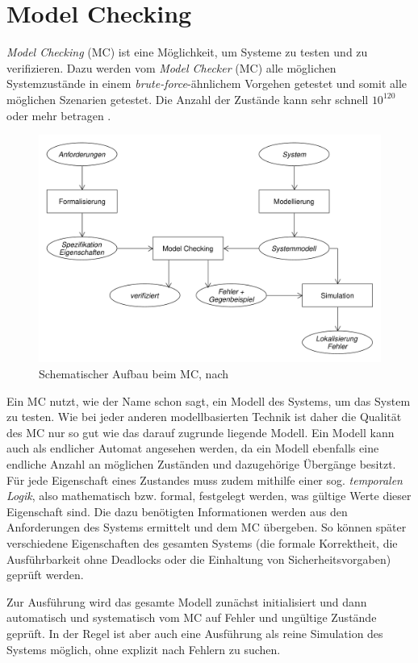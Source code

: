 \section{Model Checking}\label{sec:modelchecking}

\emph{Model Checking} (MC) ist eine Möglichkeit, um Systeme zu testen und zu verifizieren. Dazu werden vom \emph{Model Checker} (MC) alle möglichen Systemzustände in einem \emph{brute-force}-ähnlichem Vorgehen getestet und somit alle möglichen Szenarien getestet. Die Anzahl der Zustände kann sehr schnell $ 10^{120} $ oder mehr betragen \cite{Grumberg1999,Baier2008}.

\begin{figure}
	\centering
	\includegraphics[width=.8\columnwidth]{./images/mcSchema.pdf}
	\caption[Schematischer Aufbau beim MC]{Schematischer Aufbau beim MC, nach \cite{Baier2008}}
	\label{fig:mcSchema}
\end{figure}

Ein MC nutzt, wie der Name schon sagt, ein Modell des Systems, um das System zu testen. Wie bei jeder anderen modellbasierten Technik ist daher die Qualität des MC nur so gut wie das darauf zugrunde liegende Modell. Ein Modell kann auch als endlicher Automat angesehen werden, da ein Modell ebenfalls eine endliche Anzahl an möglichen Zuständen und dazugehörige Übergänge besitzt. Für jede Eigenschaft eines Zustandes muss zudem mithilfe einer sog. \emph{temporalen Logik}, also mathematisch bzw. formal, festgelegt werden, was gültige Werte dieser Eigenschaft sind. Die dazu benötigten Informationen werden aus den Anforderungen des Systems ermittelt und dem MC übergeben. So können später verschiedene Eigenschaften des gesamten Systems (\zB die formale Korrektheit, die Ausführbarkeit ohne Deadlocks oder die Einhaltung von Sicherheitsvorgaben) geprüft werden.

Zur Ausführung wird das gesamte Modell zunächst initialisiert und dann automatisch und systematisch vom MC auf Fehler und ungültige Zustände geprüft. In der Regel ist aber auch eine Ausführung als reine Simulation des Systems möglich, ohne explizit nach Fehlern zu suchen.


